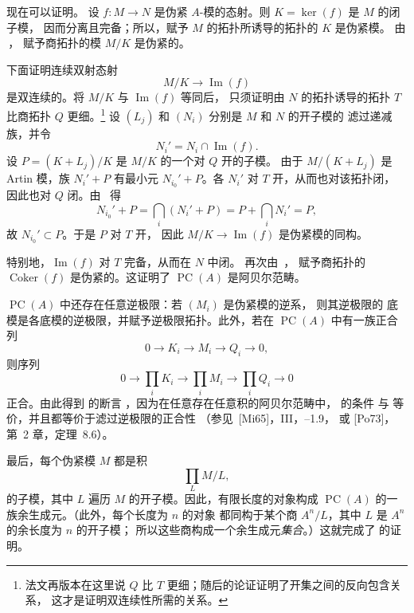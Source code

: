 \label{sga3:VIIB:0.2.B-proof}
现在可以证明。
设 \(f:M\to N\) 是伪紧 \(A\)-模的态射。则 \(K=\ker(f)\) 是 \(M\) 的闭子模，
因而分离且完备；所以，赋予 \(M\) 的拓扑所诱导的拓扑的 \(K\) 是伪紧模。
由 \,\textup{}，
赋予商拓扑的模 \(M/K\) 是伪紧的。

下面证明连续双射态射
\[
  M/K\longrightarrow\operatorname{Im}(f)
\]
是双连续的。将 \(M/K\) 与 \(\operatorname{Im}(f)\) 等同后，
只须证明由 \(N\) 的拓扑诱导的拓扑 \(T\) 比商拓扑 \(Q\) 更细。\footnote{法文再版本在这里说 \(Q\) 比 \(T\) 更细；随后的论证证明了开集之间的反向包含关系，
这才是证明双连续性所需的关系。} 设 \((L_j)\) 和 \((N_i)\) 分别是 \(M\) 和 \(N\) 的开子模的
滤过递减族，并令
\[
  N_i'=N_i\cap\operatorname{Im}(f).
\]
设 \(P=(K+L_j)/K\) 是 \(M/K\) 的一个对 \(Q\) 开的子模。
由于 \(M/(K+L_j)\) 是 Artin 模，族 \(N_i'+P\) 有最小元
\(N_{i_0}'+P\)。各 \(N_i'\) 对 \(T\) 开，从而也对该拓扑闭，
因此也对 \(Q\) 闭。由
\,\textup{} 得
\[
  N_{i_0}'+P
  =\bigcap_i(N_i'+P)
  =P+\bigcap_i N_i'
  =P,
\]
故 \(N_{i_0}'\subset P\)。于是 \(P\) 对 \(T\) 开，
因此 \(M/K\to\operatorname{Im}(f)\) 是伪紧模的同构。

特别地，\(\operatorname{Im}(f)\) 对 \(T\) 完备，从而在 \(N\) 中闭。
再次由 \,\textup{}，
赋予商拓扑的 \(\operatorname{Coker}(f)\) 是伪紧的。这证明了
\(\operatorname{PC}(A)\) 是阿贝尔范畴。

\(\operatorname{PC}(A)\) 中还存在任意逆极限：若 \((M_i)\) 是伪紧模的逆系，
则其逆极限的
底模是各底模的逆极限，并赋予逆极限拓扑。此外，若在
\(\operatorname{PC}(A)\) 中有一族正合列
\[
  0\longrightarrow K_i\longrightarrow M_i
  \longrightarrow Q_i\longrightarrow 0,
\]
则序列
\[
  0\longrightarrow\prod_i K_i\longrightarrow\prod_i M_i
  \longrightarrow\prod_i Q_i\longrightarrow 0
\]
正合。由此得到  的断言
\textup{}，因为在任意存在任意积的阿贝尔范畴中，
 的条件
\textup{} 与
\textup{} 等价，并且都等价于滤过逆极限的正合性
（\textup{参见}\ [Mi65]，III，--1.9，
或 [Po73]，第~2 章，定理~8.6）。

最后，每个伪紧模 \(M\) 都是积
\[
  \prod_L M/L,
\]
的子模，其中 \(L\) 遍历 \(M\) 的开子模。因此，有限长度的对象构成
\(\operatorname{PC}(A)\) 的一族余生成元。（此外，每个长度为 \(n\) 的对象
都同构于某个商 \(A^n/L\)，其中 \(L\) 是 \(A^n\) 的余长度为 \(n\) 的开子模；
所以这些商构成一个余生成元\emph{集合}。）这就完成了
 的证明。

